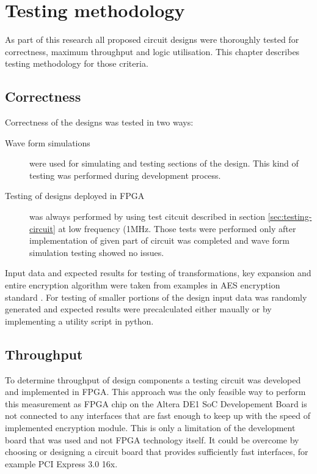 \section{Testing methodology}
\label{sec:testing-methodology}
As part of this research all proposed circuit designs were thoroughly tested for correctness, maximum throughput and logic utilisation. This chapter describes testing methodology for those criteria.

\subsection{Correctness}
Correctness of the designs was tested in two ways:
\begin{description}
\item[Wave form simulations] were used for simulating and testing sections of the design. This kind of testing was performed during development process.
\item[Testing of designs deployed in FPGA] was always performed by using test citcuit described in section \ref{sec:testing-circuit} at low frequency (1MHz. Those tests were performed only after implementation of given part of circuit was completed and wave form simulation testing showed no issues.
\end{description}

Input data and expected results for testing of transformations, key expansion and entire encryption algorithm were taken from examples in AES encryption standard \cite{aes-standard}. For testing of smaller portions of the design input data was randomly generated and expected results were precalculated either maually or by implementing a utility script in python.


\subsection{Throughput}
To determine throughput of design components a testing circuit was developed and implemented in FPGA. This approach was the only feasible way to perform this measurement as FPGA chip on the Altera DE1 SoC Developement Board is not connected to any interfaces that are fast enough to keep up with the speed of implemented encryption module. This is only a limitation of the development board that was used and not FPGA technology itself. It could be overcome by choosing or designing a circuit board that provides sufficiently fast interfaces, for example PCI Express 3.0 16x.

